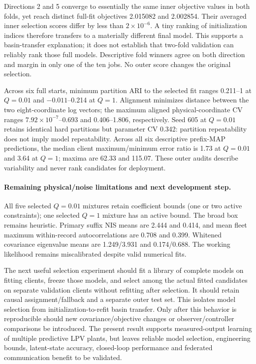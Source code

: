 Directions 2 and 5 converge to essentially the same inner objective values
in both folds, yet reach distinct full-fit objectives 2.015082 and 2.002854.
Their averaged inner selection scores differ by less than $2\times10^{-6}$.
A tiny ranking of initialization indices therefore transfers to a materially
different final model. This supports a basin-transfer explanation; it does
not establish that two-fold validation can reliably rank those full models.
Descriptive fold winners agree on both direction and margin in only one of
the ten jobs. No outer score changes the original selection.

Across six full starts, minimum partition ARI to the selected fit ranges
0.211--1 at $Q=0.01$ and $-0.011$--0.214 at $Q=1$. Alignment minimizes
distance between the two eight-coordinate log vectors; the maximum aligned
physical-coordinate CV ranges $7.92\times10^{-7}$--0.693 and 0.406--1.806,
respectively. Seed 605 at $Q=0.01$ retains identical hard partitions but
parameter CV 0.342: partition repeatability does not imply model repeatability.
Across all six descriptive prefix-MAP predictions, the median client
maximum/minimum error ratio is 1.73 at $Q=0.01$ and 3.64 at $Q=1$; maxima
are 62.33 and 115.07. These outer audits describe variability and never rank
candidates for deployment.

\paragraph{Remaining physical/noise limitations and next development step.}
All five selected $Q=0.01$ mixtures retain coefficient bounds (one or two
active constraints); one selected $Q=1$ mixture has an active bound. The
broad box remains heuristic. Primary suffix NIS means are 2.444 and 0.414,
and mean fleet maximum within-record autocorrelations are 0.708 and 0.399.
Whitened covariance eigenvalue means are 1.249/3.931 and 0.174/0.688.
The working likelihood remains miscalibrated despite valid numerical fits.

The next useful selection experiment should fit a library of complete models
on fitting clients, freeze those models, and select among the actual fitted
candidates on separate validation clients without refitting after selection.
It should retain causal assignment/fallback and a separate outer test set.
This isolates model selection from initialization-to-refit basin transfer.
Only after this behavior is reproducible should new covariance/objective
changes or observer/controller comparisons be introduced. The present result
supports measured-output learning of multiple predictive LPV plants, but
leaves reliable model selection, engineering bounds, latent-state accuracy,
closed-loop performance and federated communication benefit to be validated.

